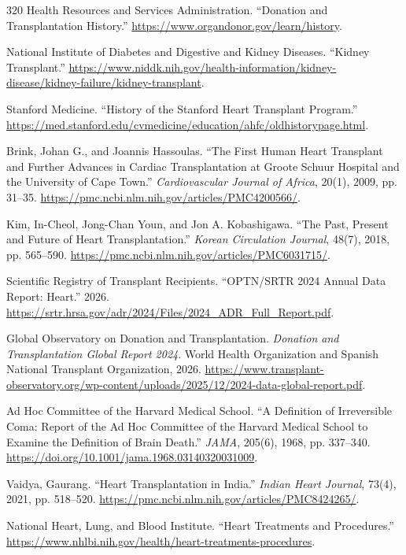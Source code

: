 \documentclass[12pt,oneside]{book}
\begin{document}
\begin{thebibliography}{320}
Health Resources and Services Administration. ``Donation and Transplantation
History.'' \url{https://www.organdonor.gov/learn/history}.

National Institute of Diabetes and Digestive and Kidney Diseases. ``Kidney
Transplant.''
\url{https://www.niddk.nih.gov/health-information/kidney-disease/kidney-failure/kidney-transplant}.

Stanford Medicine. ``History of the Stanford Heart Transplant Program.''
\url{https://med.stanford.edu/cvmedicine/education/ahfc/oldhistorypage.html}.

Brink, Johan G., and Joannis Hassoulas. ``The First Human Heart Transplant and
Further Advances in Cardiac Transplantation at Groote Schuur Hospital and the
University of Cape Town.'' \emph{Cardiovascular Journal of Africa}, 20(1),
2009, pp. 31--35.
\url{https://pmc.ncbi.nlm.nih.gov/articles/PMC4200566/}.

Kim, In-Cheol, Jong-Chan Youn, and Jon A. Kobashigawa. ``The Past, Present and
Future of Heart Transplantation.'' \emph{Korean Circulation Journal}, 48(7),
2018, pp. 565--590.
\url{https://pmc.ncbi.nlm.nih.gov/articles/PMC6031715/}.

Scientific Registry of Transplant Recipients. ``OPTN/SRTR 2024 Annual Data
Report: Heart.'' 2026.
\url{https://srtr.hrsa.gov/adr/2024/Files/2024_ADR_Full_Report.pdf}.

Global Observatory on Donation and Transplantation. \emph{Donation and
Transplantation Global Report 2024}. World Health Organization and Spanish
National Transplant Organization, 2026.
\url{https://www.transplant-observatory.org/wp-content/uploads/2025/12/2024-data-global-report.pdf}.

Ad Hoc Committee of the Harvard Medical School. ``A Definition of Irreversible
Coma: Report of the Ad Hoc Committee of the Harvard Medical School to Examine
the Definition of Brain Death.'' \emph{JAMA}, 205(6), 1968, pp. 337--340.
\url{https://doi.org/10.1001/jama.1968.03140320031009}.

Vaidya, Gaurang. ``Heart Transplantation in India.'' \emph{Indian Heart
Journal}, 73(4), 2021, pp. 518--520.
\url{https://pmc.ncbi.nlm.nih.gov/articles/PMC8424265/}.

National Heart, Lung, and Blood Institute. ``Heart Treatments and Procedures.''
\url{https://www.nhlbi.nih.gov/health/heart-treatments-procedures}.


\end{thebibliography}
\end{document}
